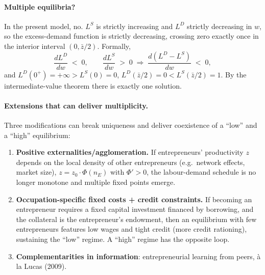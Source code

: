 \documentclass[11pt,a4paper]{article}
\begin{document}
\paragraph{Multiple equilibria?}
In the present model, no. $L^{S}$ is strictly increasing and $L^{D}$ strictly decreasing in $w$, so the excess-demand function is strictly decreasing, crossing zero exactly once in the interior interval $(0,\bar z/2)$. Formally,
\[
\frac{dL^{D}}{dw}\;<\;0,\qquad \frac{dL^{S}}{dw}\;>\;0\;\Longrightarrow\;\frac{d(L^{D}-L^{S})}{dw}\;<\;0,
\]
and $L^{D}(0^{+})=+\infty>L^{S}(0)=0$, $L^{D}(\bar z/2)=0<L^{S}(\bar z/2)=1$. By the intermediate-value theorem there is exactly one solution.

\paragraph{Extensions that can deliver multiplicity.}
Three modifications can break uniqueness and deliver coexistence of a ``low'' and a ``high'' equilibrium:
\begin{enumerate}[leftmargin=*,itemsep=1pt]
    \item \textbf{Positive externalities/agglomeration.} If entrepreneurs' productivity $z$ depends on the local density of other entrepreneurs (e.g.\ network effects, market size), $z=z_{0}\cdot \Phi(n_{E})$ with $\Phi'>0$, the labour-demand schedule is no longer monotone and multiple fixed points emerge.
    \item \textbf{Occupation-specific fixed costs + credit constraints.} If becoming an entrepreneur requires a fixed capital investment financed by borrowing, and the collateral is the entrepreneur's endowment, then an equilibrium with few entrepreneurs features low wages and tight credit (more credit rationing), sustaining the ``low'' regime. A ``high'' regime has the opposite loop.
    \item \textbf{Complementarities in information}: entrepreneurial learning from peers, à la Lucas (2009).
\end{enumerate}

\noindent{}
\end{document}
